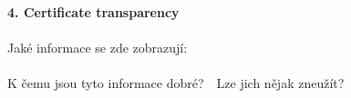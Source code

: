 \documentclass[a4paper,11pt]{article}
\begin{document}
\textbf{4. Certificate transparency} \\
~\\
Jaké informace se zde zobrazují: \underline{\hspace{8cm}}\\
~\\
K čemu jsou tyto informace dobré?~\hspace{2cm}~Lze jich nějak zneužít?
~\\
~\\
~\\
\underline{\hspace{7.5cm}}~~~~~~\underline{\hspace{8.5cm}}\\

\thispagestyle{empty}
\end{document}
